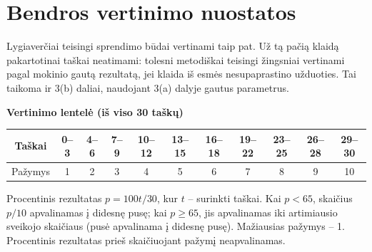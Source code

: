 \documentclass[12pt,a4paper]{exam}
\begin{document}
\section*{Bendros vertinimo nuostatos}
Lygiaverčiai teisingi sprendimo būdai vertinami taip pat. Už tą pačią klaidą pakartotinai taškai neatimami: tolesni metodiškai teisingi žingsniai vertinami pagal mokinio gautą rezultatą, jei klaida iš esmės nesupaprastino užduoties. Tai taikoma ir 3(b) daliai, naudojant 3(a) dalyje gautus parametrus.
\par\medskip

\begin{center}
\textbf{Vertinimo lentelė (iš viso 30 taškų)}\par\medskip
\setlength{\tabcolsep}{5pt}
\renewcommand{\arraystretch}{1.3}
\begin{tabular}{|c|*{10}{c|}}
\hline
Taškai & 0--3 & 4--6 & 7--9 & 10--12 & 13--15 & 16--18 & 19--22 & 23--25 & 26--28 & 29--30\\\hline
Pažymys & 1 & 2 & 3 & 4 & 5 & 6 & 7 & 8 & 9 & 10\\\hline
\end{tabular}
\end{center}
Procentinis rezultatas $p=100t/30$, kur $t$ -- surinkti taškai.
Kai $p<65$, skaičius $p/10$ apvalinamas į didesnę pusę;
kai $p\geq65$, jis apvalinamas iki artimiausio sveikojo skaičiaus
(pusė apvalinama į didesnę pusę). Mažiausias pažymys -- 1.
Procentinis rezultatas prieš skaičiuojant pažymį neapvalinamas.
\end{document}
